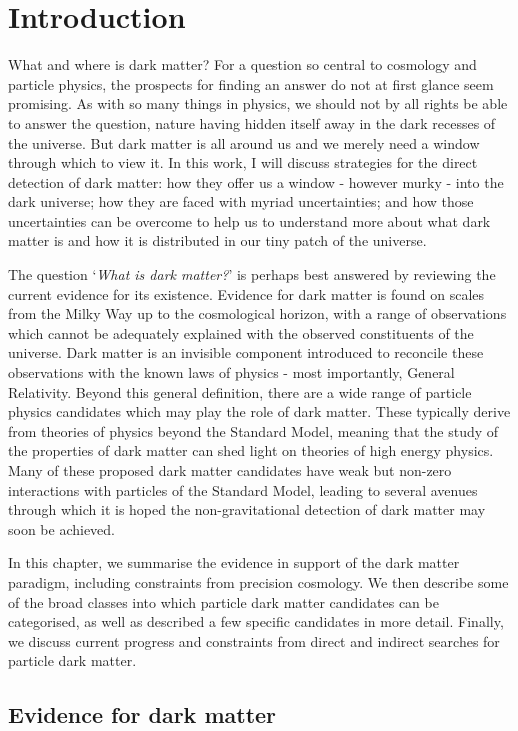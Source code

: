\chapter{Introduction}
What and where is dark matter? For a question so central to cosmology and particle physics, the prospects for finding an answer do not at first glance seem promising. As with so many things in physics, we should not by all rights be able to answer the question, nature having hidden itself away in the dark recesses of the universe. But dark matter is all around us and we merely need a window through which to view it. In this work, I will discuss strategies for the direct detection of dark matter: how they offer us a window - however murky - into the dark universe; how they are faced with myriad  uncertainties; and how those uncertainties can be overcome to help us to understand more about what dark matter is and how it is distributed in our tiny patch of the universe.

The question `\textit{What is dark matter?}' is perhaps best answered by reviewing the current evidence for its existence. Evidence for dark matter is found on scales from the Milky Way up to the cosmological horizon, with a range of observations which cannot be adequately explained with the observed constituents of the universe. Dark matter is an invisible component introduced to reconcile these observations with the known laws of physics - most importantly, General Relativity. Beyond this general definition, there are a wide range of particle physics candidates which may play the role of dark matter. These typically derive from theories of physics beyond the Standard Model, meaning that the study of the properties of dark matter can shed light on theories of high energy physics. Many of these proposed dark matter candidates have weak but non-zero interactions with particles of the Standard Model, leading to several avenues through which it is hoped the non-gravitational detection of dark matter may soon be achieved.

In this chapter, we summarise the evidence in support of the dark matter paradigm, including constraints from precision cosmology. We then describe some of the broad classes into which particle dark matter candidates can be categorised, as well as described a few specific candidates in more detail. Finally, we discuss current progress and constraints from direct and indirect searches for particle dark matter.

\section{Evidence for dark matter}

